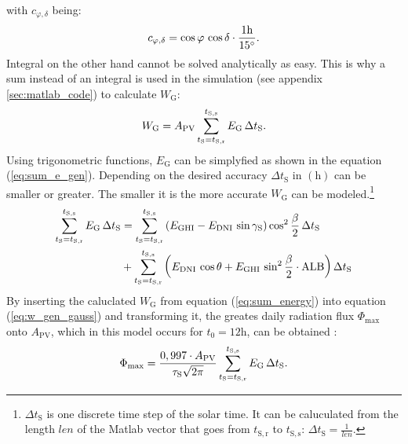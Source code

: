 with $c_{\varphi,\delta}$ being:
	\begin{equation} \label{eq:const_varphi_delta}
	\centering
		c_{\varphi,\delta} = \cos \varphi \, \cos \delta \cdot \frac{1\mathrm{h}}{15^\circ} \text{.}
	\end{equation}
Integral  on the other hand cannot be solved analytically as easy. This is why a sum instead of an integral is used in the \MATLAB simulation (see appendix \ref{sec:matlab_code}) to calculate $W_{\mathrm{G}}$:
	\begin{equation} \label{eq:sum_energy}
	\centering
		W_\mathrm{G} = A_{\mathrm{PV}} \displaystyle\sum_{t_{\mathrm{S}} = t_{\mathrm{S,r}}}^{t_{\mathrm{S,s}}} E_{\mathrm{G}} \, \Delta t_{\mathrm{S}} \text{.}
	\end{equation}
Using trigonometric functions, $E_{\mathrm{G}}$ can be simplyfied as shown in the equation (\ref{eq:sum_e_gen}). Depending on the desired accuracy $\Delta t_{\mathrm{S}}$ in $\left( \mathrm{h} \right)$ can be smaller or greater. The smaller it is the more accurate $W_{\mathrm{G}}$ can be modeled.\footnote{$\Delta t_{\mathrm{S}}$ is one discrete time step of the solar time. It can be caluculated from the length $len$ of the Matlab vector that goes from $t_{\mathrm{S,r}}$ to $t_{\mathrm{S,s}}$: $\Delta t_{\mathrm{S}} = \frac{1}{len}$.}
	\begin{equation} \label{eq:sum_e_gen}
	\centering
		\begin{aligned}
		\displaystyle\sum_{t_{\mathrm{S}} = t_{\mathrm{S,r}}}^{t_{\mathrm{S,s}}} E_{\mathrm{G}} \, \Delta t_{\mathrm{S}} &= \displaystyle\sum_{t_{\mathrm{S}} = t_{\mathrm{S,r}}}^{t_{\mathrm{S,s}}} \left(E_{\mathrm{GHI}} - E_{\mathrm{DNI}} \, \sin \gamma_{\mathrm{S}} \right) \cos^2 \frac{\beta}{2} \, \Delta t_{\mathrm{S}} \\
		&+ \displaystyle\sum_{t_{\mathrm{S}} = t_{\mathrm{S,r}}}^{t_{\mathrm{S,s}}} \left(E_{\mathrm{DNI}} \, \cos \theta + E_{\mathrm{GHI}} \, \sin^2 \frac{\beta}{2} \cdot \mathrm{ALB} \right)\Delta t_{\mathrm{S}}
		\end{aligned}
	\end{equation}
By inserting the caluclated $W_{\mathrm{G}}$ from equation (\ref{eq:sum_energy}) into equation (\ref{eq:w_gen_gauss}) and transforming it, the greates daily radiation flux $\Phi_{\mathrm{max}}$ onto $A_{\mathrm{PV}}$, which in this model occurs for $t_0 = 12\mathrm{h}$, can be obtained \cite{Appelbaum:1992, Landis:1995, Prechtl:2006, Prechtl:2008}:
	\begin{equation} \label{eq:phi_max_sum}
	\centering
		\Phi_{\mathrm{max}} = \frac{0,997 \cdot A_{\mathrm{PV}}}{\tau_\mathrm{S} \sqrt{2\pi}} \displaystyle\sum_{t_{\mathrm{S}} = t_{\mathrm{S,r}}}^{t_{\mathrm{S,s}}} E_{\mathrm{G}} \, \Delta t_{\mathrm{S}} \text{.}
	\end{equation}

